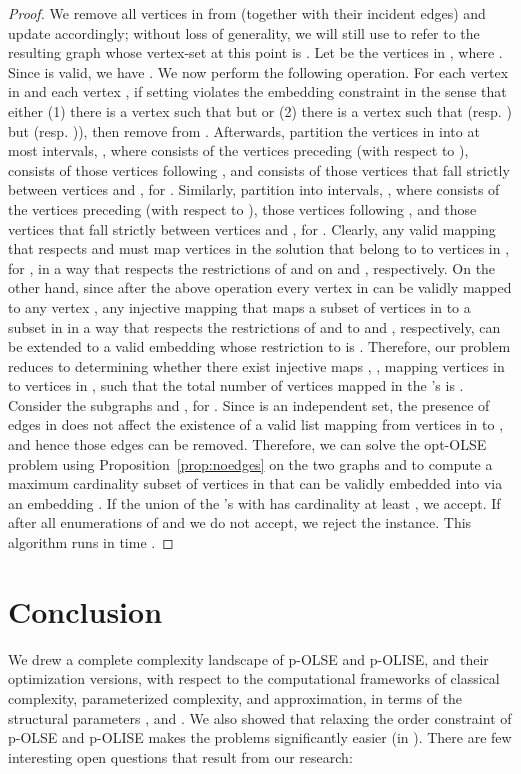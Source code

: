 \documentclass[11pt]{article}
\begin{document}
\begin{proof}
We remove all vertices in  from  (together with their incident edges) and update  accordingly; without loss of generality, we will still use  to refer to the resulting graph whose vertex-set at this point is . Let  be the vertices in , where . Since  is valid, we have . We now perform the following operation. For each vertex  in  and each vertex , if setting  violates the embedding constraint in the sense that either (1) there is a vertex  such that  but  or (2) there is a vertex  such that  (resp. ) but  (resp. )), then remove  from . Afterwards, partition the vertices in  into at most  intervals, , where  consists of the vertices preceding  (with respect to ),  consists of those vertices following , and  consists of those vertices that fall strictly between vertices  and , for . Similarly, partition  into  intervals, , where  consists of the vertices preceding  (with respect to ),  those vertices following , and  those vertices that fall strictly between vertices  and , for . Clearly, any valid mapping  that respects  and  must map vertices in the solution that belong to  to vertices in , for , in a way that respects the restrictions of  and  on  and , respectively. On the other hand, since after the above operation every vertex  in  can be validly mapped to any vertex , any injective mapping  that maps a subset of vertices in  to a subset in  in a way that respects the restrictions of  and  to  and , respectively, can be extended to a valid embedding whose restriction to  is . Therefore, our problem reduces to determining whether there exist injective maps , , mapping vertices in  to vertices in , such that the total number of vertices mapped in the 's is . Consider the subgraphs  and , for . Since  is an independent set, the presence of edges in  does not affect the existence of a valid list mapping from vertices in  to , and hence those edges can be removed. Therefore, we can solve the opt-OLSE problem using Proposition~\ref{prop:noedges} on the two graphs  and  to compute a maximum cardinality subset of vertices  in  that can be validly embedded into  via an embedding . If the union of the 's with  has cardinality at least , we accept. If after all enumerations of  and  we do not accept, we reject the instance. This algorithm runs in time . \end{proof}

\section{Conclusion}\label{sec:conclusion}
We drew a complete complexity landscape of p-OLSE and p-OLISE, and their optimization versions, with respect to the computational frameworks of classical complexity, parameterized complexity, and approximation, in terms of the structural parameters ,  and .  We also showed that relaxing the order constraint of p-OLSE and p-OLISE makes the problems significantly easier (in ).
There are few interesting open questions that result from our research:
\end{document}
